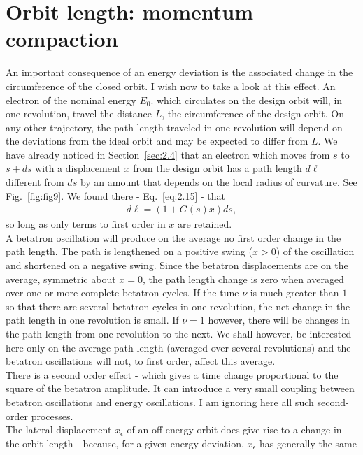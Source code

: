 \section{Orbit length: momentum compaction}\label{sec:3.2}

An important consequence of an energy deviation is the associated change in the circumference
 of the closed orbit. I wish now to take a look at this effect. An electron of the nominal energy $E_0$. which circulates on the design orbit will, in one revolution, travel the distance $L$, the circumference of the design orbit. On any other trajectory, the path length traveled in one revolution will depend on the deviations from the ideal orbit and may be expected to differ from $L$. We have already noticed in Section~\ref{sec:2.4} that an electron which moves from $s$ to $s + ds$ with a displacement $x$ from the design orbit has a path length $d\ell$ different from $ds$ by an amount that depends on the local radius of curvature. See Fig.~\ref{fig:fig9}. We found there - Eq.~\eqref{eq:2.15} - that
\begin{align} \label{eq:3.7}
	d\ell = (1 + G(s)x) ds,
\end{align}
so long as only terms to first order in $x$ are retained.\\
A betatron oscillation will produce on the average no first order change in the path length. The path is lengthened on a positive swing ($x > 0$) of the oscillation and shortened on a negative swing. Since the betatron displacements are on the average, symmetric about $x = 0$, the path length change is zero when averaged over one or more complete betatron cycles. If the tune $\nu$ is much greater than $1$ so that there are several betatron cycles in one revolution, the net
change in the path length in one revolution is small. If $\nu = 1$ however, there will be changes in the path length from one revolution to the next. We shall however, be interested here only on the average path length (averaged over several revolutions) and the betatron oscillations will not, to first order, affect this average.\\
There is a second order effect - which gives a time change proportional to the square of the betatron amplitude. It can introduce a very small coupling between betatron oscillations
 and energy oscillations. I am ignoring here all such second-order processes.\\
 The lateral displacement $x_\epsilon$ of an off-energy orbit does give rise to a change in
the orbit length - because, for a given energy deviation, $x_\epsilon$ has generally the same
